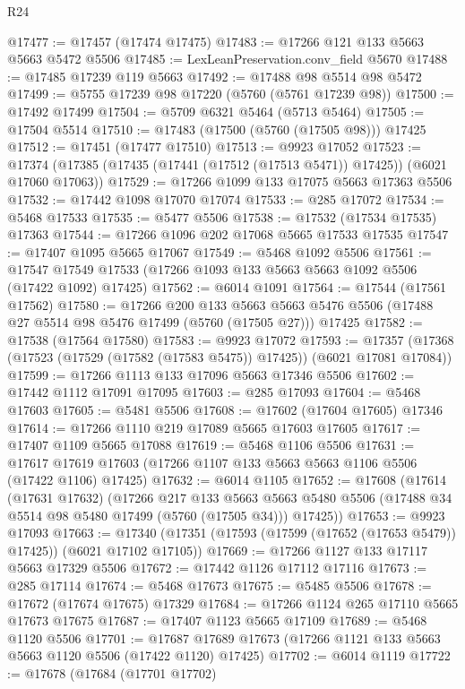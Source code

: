 \begin{lexlean}{R24}
\begin{coremodule}
@17477 := @17457 (@17474 @17475)
@17483 := @17266 @121 @133 @5663 @5663 @5472 @5506
@17485 := LexLeanPreservation.conv_field @5670
@17488 := @17485 @17239 @119 @5663
@17492 := @17488 @98 @5514 @98 @5472
@17499 := @5755 @17239 @98 @17220 (@5760 (@5761 @17239 @98))
@17500 := @17492 @17499
@17504 := @5709 @6321 @5464 (@5713 @5464)
@17505 := @17504 @5514
@17510 := @17483 (@17500 (@5760 (@17505 @98))) @17425
@17512 := @17451 (@17477 @17510)
@17513 := @9923 @17052
@17523 := @17374 (@17385 (@17435 (@17441 (@17512 (@17513 @5471)) @17425)) (@6021 @17060 @17063))
@17529 := @17266 @1099 @133 @17075 @5663 @17363 @5506
@17532 := @17442 @1098 @17070 @17074
@17533 := @285 @17072
@17534 := @5468 @17533
@17535 := @5477 @5506
@17538 := @17532 (@17534 @17535) @17363
@17544 := @17266 @1096 @202 @17068 @5665 @17533 @17535
@17547 := @17407 @1095 @5665 @17067
@17549 := @5468 @1092 @5506
@17561 := @17547 @17549 @17533 (@17266 @1093 @133 @5663 @5663 @1092 @5506 (@17422 @1092) @17425)
@17562 := @6014 @1091
@17564 := @17544 (@17561 @17562)
@17580 := @17266
    @200
    @133
    @5663
    @5663
    @5476
    @5506
    (@17488 @27 @5514 @98 @5476 @17499 (@5760 (@17505 @27)))
    @17425
@17582 := @17538 (@17564 @17580)
@17583 := @9923 @17072
@17593 := @17357 (@17368 (@17523 (@17529 (@17582 (@17583 @5475)) @17425)) (@6021 @17081 @17084))
@17599 := @17266 @1113 @133 @17096 @5663 @17346 @5506
@17602 := @17442 @1112 @17091 @17095
@17603 := @285 @17093
@17604 := @5468 @17603
@17605 := @5481 @5506
@17608 := @17602 (@17604 @17605) @17346
@17614 := @17266 @1110 @219 @17089 @5665 @17603 @17605
@17617 := @17407 @1109 @5665 @17088
@17619 := @5468 @1106 @5506
@17631 := @17617 @17619 @17603 (@17266 @1107 @133 @5663 @5663 @1106 @5506 (@17422 @1106) @17425)
@17632 := @6014 @1105
@17652 := @17608
    (@17614
      (@17631 @17632)
      (@17266
        @217
        @133
        @5663
        @5663
        @5480
        @5506
        (@17488 @34 @5514 @98 @5480 @17499 (@5760 (@17505 @34)))
        @17425))
@17653 := @9923 @17093
@17663 := @17340 (@17351 (@17593 (@17599 (@17652 (@17653 @5479)) @17425)) (@6021 @17102 @17105))
@17669 := @17266 @1127 @133 @17117 @5663 @17329 @5506
@17672 := @17442 @1126 @17112 @17116
@17673 := @285 @17114
@17674 := @5468 @17673
@17675 := @5485 @5506
@17678 := @17672 (@17674 @17675) @17329
@17684 := @17266 @1124 @265 @17110 @5665 @17673 @17675
@17687 := @17407 @1123 @5665 @17109
@17689 := @5468 @1120 @5506
@17701 := @17687 @17689 @17673 (@17266 @1121 @133 @5663 @5663 @1120 @5506 (@17422 @1120) @17425)
@17702 := @6014 @1119
@17722 := @17678
    (@17684
      (@17701 @17702)

\end{coremodule}
\end{lexlean}
